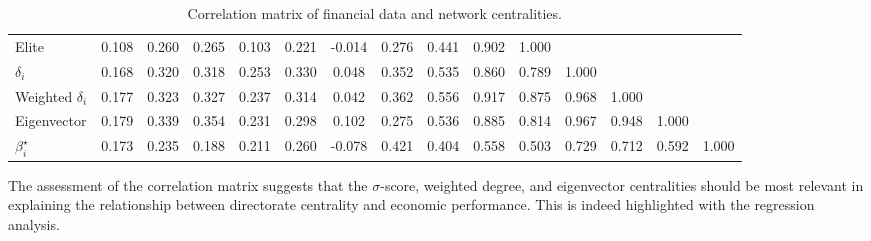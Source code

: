 \documentclass[11pt,fleqn]{article}
\begin{document}
\begin{table}[t!]
\begin{onehalfspace}
{\begin{tabular}{@{\extracolsep{5pt}} lcccccccccccccc}
				Elite                                                         & 0.108  & 0.260                                                         & 0.265  & 0.103    & 0.221                                                       & -0.014 & 0.276     & 0.441 & 0.902        & 1.000 &              &                                                                 &             &             \\
				$\delta_{i}$                                                  & 0.168  & 0.320                                                         & 0.318  & 0.253    & 0.330                                                       & 0.048  & 0.352     & 0.535 & 0.860        & 0.789 & 1.000        &                                                                 &             &             \\
				Weighted $\delta_{i}$                                         & 0.177  & 0.323                                                         & 0.327  & 0.237    & 0.314                                                       & 0.042  & 0.362     & 0.556 & 0.917        & 0.875 & 0.968        & 1.000                                                           &             &             \\
				Eigenvector                                                   & 0.179  & 0.339                                                         & 0.354  & 0.231    & 0.298                                                       & 0.102  & 0.275     & 0.536 & 0.885        & 0.814 & 0.967        & 0.948                                                           & 1.000       &             \\
				$\beta^{\star}_{i}$                                                   & 0.173  & 0.235                                                         & 0.188  & 0.211    & 0.260                                                       & -0.078 & 0.421     & 0.404 & 0.558        & 0.503 & 0.729        & 0.712                                                           & 0.592       & 1.000       \\
				\bottomrule
			\end{tabular}
		}
		\caption{Correlation matrix of financial data and network centralities.}
		\label{fin-corr}
	\end{onehalfspace}
\end{table}


The assessment of the correlation matrix suggests that the $\sigma$-score, weighted degree, and eigenvector centralities should be most relevant in explaining the relationship between directorate centrality and economic performance. This is indeed highlighted with the regression analysis.
\end{document}
